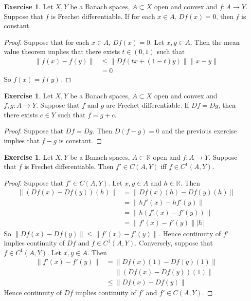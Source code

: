 \documentclass[12pt]{amsart}
\theoremstyle{definition}
\theoremstyle{remark}
\theoremstyle{definition}
\newtheorem{ex}[definition]{Exercise}
\newcommand{\R}{\mathbb{R}}
\begin{document}
	\begin{ex}
	Let $X, Y$ be a Banach spaces, $A \subset X$ open and convex and $f:A \rightarrow Y$. Suppose that $f$ is Frechet differentiable. If for each $x \in A$, $Df(x) = 0$, then $f$ is constant.
	\end{ex}
	
	\begin{proof}
	Suppose that for each $x \in A$, $Df(x) = 0$. Let $x,y \in A$. Then the mean value theorem implies that there exists $t \in (0, 1)$ such that 
	\begin{align*}
	\|f(x) - f(y)\| 
	&\leq \|Df(tx + (1-t)y)\| \|x-y\| \\
	&= 0
	\end{align*}
	So $f(x) = f(y)$. 
	\end{proof}
	
	\begin{ex}
	Let $X, Y$ be a Banach spaces, $A \subset X$ open and convex and $f,g:A \rightarrow Y$. Suppose that $f$ and $g$ are Frechet differentiable. If $Df = Dg$, then there exists $c \in Y$ such that $f = g+c$.
	\end{ex}
	
	\begin{proof}
		Suppose that $Df = Dg$. Then $D(f-g) = 0$ and the previous exercise implies that $f -g$ is constant.
	\end{proof}		
	
	\begin{ex}
	Let $X, Y$ be a Banach spaces, $A \subset \R$ open and $f:A \rightarrow Y$. Suppose that $f$ is Frechet differentiable. Then $f' \in C(A,Y)$ iff $f \in C^1(A,Y)$.
	\end{ex}
	
	\begin{proof}
	Suppose that $f' \in C(A, Y)$. Let $x,y \in A$ and $h \in \R$. Then 
	\begin{align*}
	\|(Df(x)- Df(y))(h)\| 
	&= \|Df(x)(h) - Df(y)(h)\| \\
	&=  \|hf'(x) - hf'(y)\| \\
	&= \|h(f'(x) - f'(y))\| \\
	&= \|f'(x) - f'(y)\||h|
	\end{align*}
	So $\|Df(x) - Df(y)\| \leq \|f'(x) - f'(y)\|$. Hence continuity of $f'$ implies continuity of $Df$ and $f \in C^1(A, Y)$.
	Conversely, suppose that $f \in C^1(A, Y)$. Let $x,y \in A$. Then 
	\begin{align*}
	\|f'(x) - f'(y)\| 
	&= \|Df(x)(1) - Df(y)(1)\| \\
	&= \|(Df(x) - Df(y))(1)\| \\
	& \leq \| Df(x) - Df(y)\|
	\end{align*}
	Hence continuity of $Df$ implies continuity of $f'$ and $f' \in C(A, Y)$.
	\end{proof}
	
\end{document}
